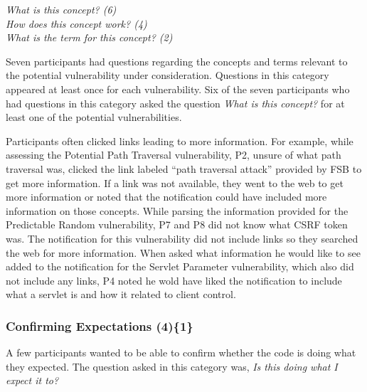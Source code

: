 \documentclass{acm_proc_article-sp}
\begin{document}
\noindent\emph{What is this concept? (6)} \\
\emph{How does this concept work? (4)} \\
\emph{What is the term for this concept? (2)}

 
Seven participants had questions regarding the concepts and terms relevant to the potential vulnerability under consideration. 
Questions in this category appeared at least once for each vulnerability.
Six of the seven participants who had questions in this category asked the question \textit{What is this concept?} for at least one of the potential vulnerabilities.


Participants often clicked links leading to more information.
For example, while assessing the Potential Path Traversal vulnerability, P2, unsure of what path traversal was, clicked the link labeled ``path traversal attack'' provided by FSB to get more information.
If a link was not available, they went to the web to get more information or noted that the notification could have included more information on those concepts.
While parsing the information provided for the Predictable Random vulnerability, P7 and P8 did not know what CSRF token was.
The notification for this vulnerability did not include links so they searched the web for more information. 
When asked what information he would like to see added to the notification for the Servlet Parameter vulnerability, which also did not include any links, P4 noted he wold have liked the notification to include what a servlet is and how it related to client control.



\subsubsection{\textbf{Confirming Expectations (4)\{1\}}}\label{ce}

A few participants wanted to be able to confirm whether the code is doing what they expected. 
The question asked in this category was, \textit{Is this doing what I expect it to?} 
\end{document}
